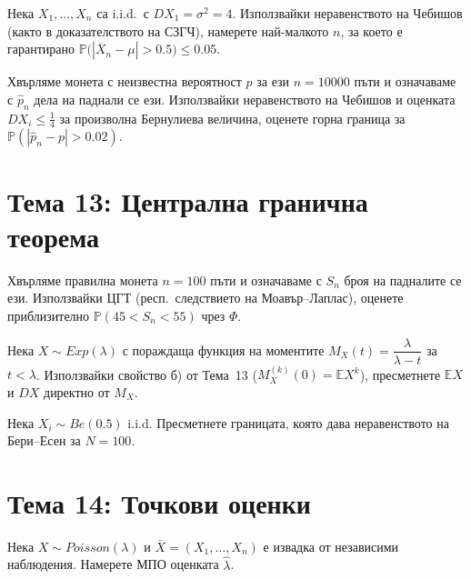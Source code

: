 \begin{probbox}[Задача 12.2]
Нека $X_1,\dots,X_n$ са i.i.d.\ с $DX_1=\sigma^2=4$. Използвайки
неравенството на Чебишов (както в доказателството на СЗГЧ), намерете
най-малкото $n$, за което е гарантирано $\mathbb P\big(|\overline
X_n-\mu|>0.5\big)\le0.05$.
\end{probbox}

\begin{probbox}[Задача 12.3]
Хвърляме монета с неизвестна вероятност $p$ за ези $n=10000$ пъти и
означаваме с $\hat p_n$ дела на паднали се ези. Използвайки
неравенството на Чебишов и оценката $DX_i\le\tfrac14$ за произволна
Бернулиева величина, оценете горна граница за $\mathbb P(|\hat p_n-
p|>0.02)$.
\end{probbox}

\section*{Тема 13: Централна гранична теорема}

\begin{probbox}[Задача 13.1]
Хвърляме правилна монета $n=100$ пъти и означаваме с $S_n$ броя на
падналите се ези. Използвайки ЦГТ (респ.\ следствието на
Моавър--Лаплас), оценете приблизително $\mathbb P(45<S_n<55)$ чрез
$\Phi$.
\end{probbox}

\begin{probbox}[Задача 13.2]
Нека $X\sim Exp(\lambda)$ с пораждаща функция на моментите
$M_X(t)=\dfrac\lambda{\lambda-t}$ за $t<\lambda$. Използвайки
свойство б) от Тема~13 ($M_X^{(k)}(0)=\mathbb EX^k$), пресметнете
$\mathbb EX$ и $DX$ директно от $M_X$.
\end{probbox}

\begin{probbox}[Задача 13.3]
Нека $X_i\sim Be(0.5)$ i.i.d. Пресметнете границата, която дава
неравенството на Бери--Есен за $N=100$.
\end{probbox}

\section*{Тема 14: Точкови оценки}

\begin{probbox}[Задача 14.1]
Нека $X\sim Poisson(\lambda)$ и $\bar X=(X_1,\dots,X_n)$ е извадка от
независими наблюдения. Намерете МПО оценката $\hat\lambda$.
\end{probbox}


